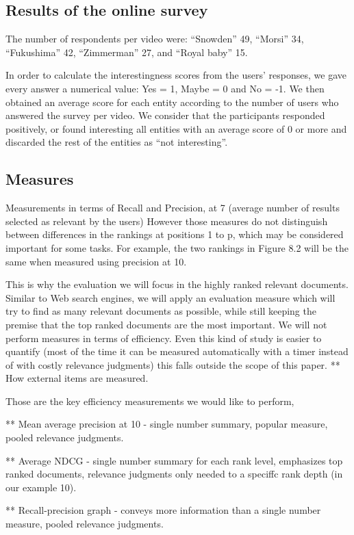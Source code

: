 \documentclass{llncs}
\begin{document}
\subsection{Results of the online survey}
The number of respondents per video were: “Snowden” 49, “Morsi” 34, “Fukushima” 42, “Zimmerman” 27, and “Royal baby” 15.

In order to calculate the interestingness scores from the users’ responses, we gave every answer a numerical value: Yes = 1, Maybe = 0 and No = -1.  We then obtained an average score for each entity according to the number of users who answered the survey per video.  We consider that the participants responded positively, or found interesting all entities with an average score of 0 or more and discarded the rest of the entities as “not interesting”.


\subsection{Measures}
Measurements in terms of Recall and Precision, at 7 (average number of results selected as relevant by the users)
However those measures do not distinguish between differences in the rankings at positions 1 to p, which may be considered important for some tasks. For example, the two rankings in Figure 8.2 will be the same when measured using precision at 10.

This is why  the evaluation we will focus in the highly ranked relevant documents. Similar to Web search engines, we will apply an evaluation measure which will try to find as many relevant documents as possible, while still keeping the  premise that the top ranked documents are the most important. We will not perform measures in terms of efficiency. Even this kind of study is easier to quantify (most of the time it can be measured automatically with a timer instead of with costly relevance judgments) this falls outside the scope of this paper.
** How external items are measured.

Those are the key efficiency measurements we would like to perform,

** Mean average precision at 10  - single number summary, popular measure, pooled
relevance judgments.

** Average NDCG - single number summary for each rank level, emphasizes top ranked documents, relevance judgments only needed to a speciffc rank depth
(in our example 10).

** Recall-precision graph - conveys more information than a single number measure, pooled relevance judgments.
\end{document}
